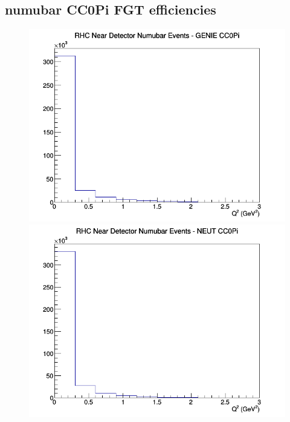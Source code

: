 \subsection{numubar CC0Pi FGT efficiencies}
\begin{figure}[h]
\includegraphics[width=\linewidth]{eff_Q2/FGT/CC0Pi_RHC_ND_numubar_Q2_GENIE.png}
\endminipage
{}
\includegraphics[width=\linewidth]{eff_Q2/FGT/CC0Pi_RHC_ND_numubar_Q2_NEUT.png}
\endminipage
{}

\end{figure}
